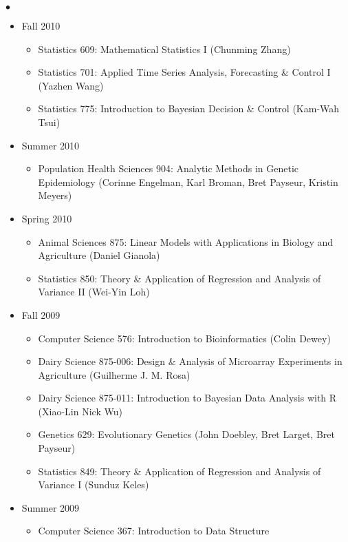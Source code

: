 \documentclass[margin,line,10pt]{res}
\newenvironment{list2}{
  \begin{list}{$\bullet$}{%
      \setlength{\itemsep}{0in}
      \setlength{\parsep}{0in} \setlength{\parskip}{0in}
      \setlength{\topsep}{0in} \setlength{\partopsep}{0in} 
      \setlength{\leftmargin}{0.2in}}}{\end{list}}
\begin{document}
\begin{resume}
\begin{list2}
\begin{itemize}
\item Fall 2010
\begin{itemize}
\item    Statistics 609: Mathematical Statistics I (Chunming Zhang)
\item    Statistics 701: Applied Time Series Analysis, Forecasting \& Control I (Yazhen Wang)
\item    Statistics 775: Introduction to Bayesian Decision \& Control (Kam-Wah Tsui)
\end{itemize}


\item Summer 2010
\begin{itemize}
\item    Population Health Sciences 904: Analytic Methods in Genetic Epidemiology (Corinne Engelman, Karl Broman, Bret Payseur, Kristin Meyers)
\end{itemize}


\item Spring 2010
\begin{itemize}

\item    Animal Sciences 875: Linear Models with Applications in Biology and Agriculture (Daniel Gianola)
\item    Statistics 850: Theory \& Application of Regression and Analysis of Variance II (Wei-Yin Loh)

\end{itemize}


\item Fall 2009
\begin{itemize}
\item    Computer Science 576: Introduction to Bioinformatics (Colin Dewey)
\item    Dairy Science 875-006: Design \& Analysis of Microarray Experiments in Agriculture (Guilherme J. M. Rosa)
\item    Dairy Science 875-011: Introduction to Bayesian Data Analysis with R (Xiao-Lin Nick Wu)
\item    Genetics 629: Evolutionary Genetics (John Doebley, Bret Larget, Bret Payseur)
\item    Statistics 849: Theory \& Application of Regression and Analysis of Variance I (Sunduz Keles)
\end{itemize}




\item Summer 2009
\begin{itemize}
\item Computer Science 367: Introduction to Data Structure
\end{itemize}


\end{itemize}
\end{list2}
\end{resume}
\end{document}
